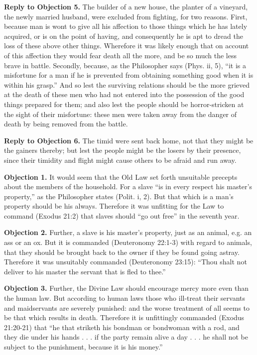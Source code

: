 \textbf{Reply to Objection 5.} The builder of a new house, the planter of a vineyard, the newly married husband, were excluded from fighting, for two reasons. First, because man is wont to give all his affection to those things which he has lately acquired, or is on the point of having, and consequently he is apt to dread the loss of these above other things. Wherefore it was likely enough that on account of this affection they would fear death all the more, and be so much the less brave in battle. Secondly, because, as the Philosopher says (Phys. ii, 5), ``it is a misfortune for a man if he is prevented from obtaining something good when it is within his grasp.'' And so lest the surviving relations should be the more grieved at the death of these men who had not entered into the possession of the good things prepared for them; and also lest the people should be horror-stricken at the sight of their misfortune: these men were taken away from the danger of death by being removed from the battle.

\textbf{Reply to Objection 6.} The timid were sent back home, not that they might be the gainers thereby; but lest the people might be the losers by their presence, since their timidity and flight might cause others to be afraid and run away.


\textbf{Objection 1.} It would seem that the Old Law set forth unsuitable precepts about the members of the household. For a slave ``is in every respect his master's property,'' as the Philosopher states (Polit. i, 2). But that which is a man's property should be his always. Therefore it was unfitting for the Law to command (Exodus 21:2) that slaves should ``go out free'' in the seventh year.

\textbf{Objection 2.} Further, a slave is his master's property, just as an animal, e.g. an ass or an ox. But it is commanded (Deuteronomy 22:1-3) with regard to animals, that they should be brought back to the owner if they be found going astray. Therefore it was unsuitably commanded (Deuteronomy 23:15): ``Thou shalt not deliver to his master the servant that is fled to thee.''

\textbf{Objection 3.} Further, the Divine Law should encourage mercy more even than the human law. But according to human laws those who ill-treat their servants and maidservants are severely punished: and the worse treatment of all seems to be that which results in death. Therefore it is unfittingly commanded (Exodus 21:20-21) that ``he that striketh his bondman or bondwoman with a rod, and they die under his hands . . . if the party remain alive a day . . . he shall not be subject to the punishment, because it is his money.''

